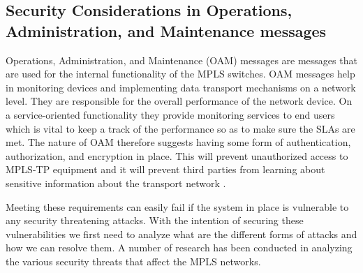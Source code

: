 \subsection*{Security Considerations in Operations, Administration, and Maintenance messages}
Operations, Administration, and Maintenance (OAM) messages are messages that are used for the internal functionality of the MPLS switches. OAM messages help in monitoring devices and implementing data transport mechanisms on a network level. They are responsible for the overall performance of the network device. On a service-oriented functionality they provide monitoring services to end users which is vital to keep a track of the performance so as to make sure the SLAs are met. The nature of OAM therefore suggests having some form of authentication, authorization, and encryption in place. This will prevent unauthorized access to MPLS-TP equipment and it will prevent third parties from learning about sensitive information about the transport network \cite{rfc5860}.

Meeting these requirements can easily fail if the system in place is vulnerable to any security threatening attacks. With the intention of securing these vulnerabilities we first need to analyze what are the different forms of attacks and how we can resolve them. A number of research has been conducted in analyzing the various security threats that affect the MPLS networks.


